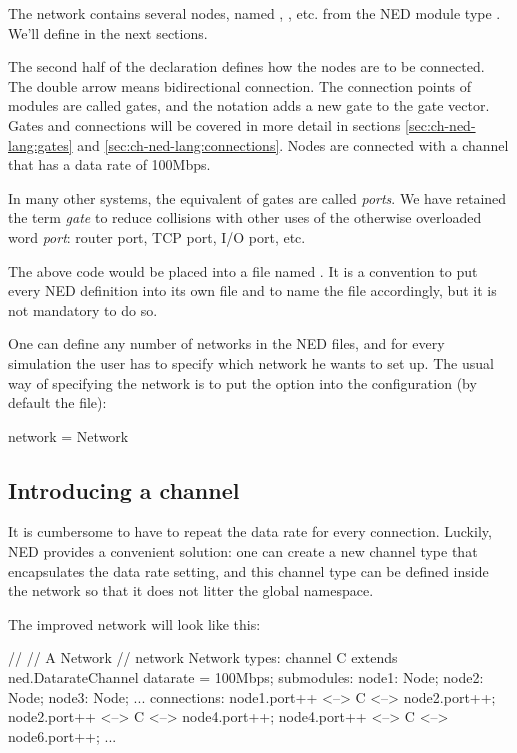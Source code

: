 The network contains several nodes, named , , etc.
from the NED module type . We'll define  in the next
sections.

The second half of the declaration defines how the nodes are to be
connected. The double arrow means bidirectional connection. The connection
points of modules are called gates, and the  notation adds a
new gate to the  gate vector. Gates and connections will be
covered in more detail in sections \ref{sec:ch-ned-lang:gates} and
\ref{sec:ch-ned-lang:connections}. Nodes are connected with a channel that
has a data rate of 100Mbps.

\begin{note}
    In many other systems, the equivalent of {\opp} gates are called
    \textit{ports}. We have retained the term \textit{gate} to reduce
    collisions with other uses of the otherwise overloaded word
    \textit{port}: router port, TCP port, I/O port, etc.
\end{note}

The above code would be placed into a file named . It is
a convention to put every NED definition into its own file and to name the
file accordingly, but it is not mandatory to do so.

One can define any number of networks in the NED files, and for every
simulation the user has to specify which network he wants to set up.
The usual way of specifying the network is to put the 
option into the configuration (by default the  file):

\begin{inifile}
[General]
network = Network
\end{inifile}


\subsection{Introducing a channel}

It is cumbersome to have to repeat the data rate for every connection.
Luckily, NED provides a convenient solution: one can create a new channel
type that encapsulates the data rate setting, and this channel type can
be defined inside the network so that it does not litter the global
namespace.

The improved network will look like this:

\begin{ned}
//
// A Network
//
network Network
{
    types:
        channel C extends ned.DatarateChannel {
            datarate = 100Mbps;
        }
    submodules:
        node1: Node;
        node2: Node;
        node3: Node;
        ...
    connections:
        node1.port++ <--> C <--> node2.port++;
        node2.port++ <--> C <--> node4.port++;
        node4.port++ <--> C <--> node6.port++;
        ...
}
\end{ned}

